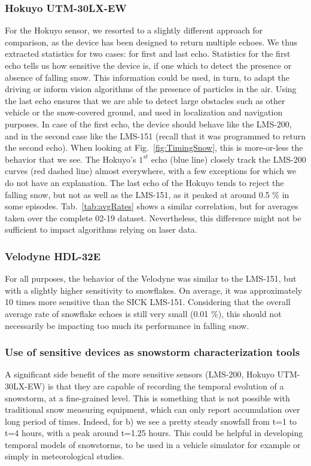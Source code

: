 \subsubsection{Hokuyo UTM-30LX-EW}
For the Hokuyo sensor, we resorted to a slightly different approach for comparison, as the device has been designed to return multiple echoes. We thus extracted statistics for two cases: for first and last echo. Statistics for the first echo tells us how sensitive the device is, if one which to detect the presence or absence of falling snow. This information could be used, in turn, to adapt the driving or inform vision algorithms of the presence of particles in the air. Using the last echo ensures that we are able to detect large obstacles such as other vehicle or the snow-covered ground, and used in localization and navigation purposes. In case of the first echo, the device should behave like the LMS-200, and in the second case like the LMS-151 (recall that it was programmed to return the second echo). When looking at Fig.~\ref{fig:TimingSnow}, this is more-or-less the behavior that we see. The Hokuyo's $1^{st}$ echo (blue line) closely track the LMS-200 curves (red dashed line) almost everywhere, with a few exceptions for which we do not have an explanation. The last echo of the Hokuyo tends to reject the falling snow, but not as well as the LMS-151, as it peaked at around 0.5 \% in some episodes. Tab.~\ref{tab:avgRates} shows a similar correlation, but for averages taken over the complete 02-19 dataset. Nevertheless, this difference might not be sufficient to impact algorithms relying on laser data.

\subsubsection{Velodyne HDL-32E}
For all purposes, the behavior of the Velodyne was similar to the LMS-151, but with a slightly higher sensitivity to snowflakes. On average, it was approximately 10 times more sensitive than the SICK LMS-151. Considering that the overall average rate of snowflake echoes is still very small (0.01 \%), this should not necessarily be impacting too much its performance in falling snow.

\subsubsection{Use of sensitive devices as snowstorm characterization tools}
A significant side benefit of the more sensitive sensors (LMS-200, Hokuyo UTM-30LX-EW) is that they are capable of recording the temporal evolution of a snowstorm, at a fine-grained level. This is something that is not possible with traditional snow measuring equipment, which can only report accumulation over long period of times. Indeed, for b) we see a pretty steady snowfall from t=1 to t=4 hours, with a peak around t=1.25 hours. This could be helpful in developing temporal models of snowstorms, to be used in a vehicle simulator for example or simply in meteorological studies.

